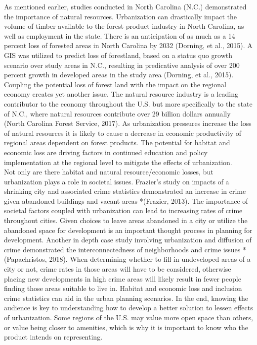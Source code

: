\documentclass[20pt]{article}
\begin{document}
\vspace{5mm} As mentioned earlier, studies conducted in North Carolina (N.C.) demonstrated the importance of natural resources. Urbanization can drastically impact the volume of timber available to the forest product industry in North Carolina, as well as employment in the state. There is an anticipation of as much as a 14 percent loss of forested areas in North Carolina by 2032 (Dorning, et al., 2015). A GIS was utilized to predict loss of forestland, based on a status quo growth scenario over study areas in N.C., resulting in predicative analysis of over 200 percent growth in developed areas in the study area (Dorning, et al., 2015). Coupling the potential loss of forest land with the impact on the regional economy creates yet another issue. The natural resource industry is a leading contributor to the economy throughout the U.S. but more specifically to the state of N.C., where natural resources contribute over 29 billion dollars annually (North Carolina Forest Service, 2017). As urbanization pressures increase the loss of natural resources it is likely to cause a decrease in economic productivity of regional areas dependent on forest products. The potential for habitat and economic loss are driving factors in continued education and policy implementation at the regional level to mitigate the effects of urbanization.\\   
\vspace{5mm} Not only are there habitat and natural resource/economic losses, but urbanization plays a role in societal issues. Frazier’s study on impacts of a shrinking city and associated crime statistics demonstrated an increase in crime given abandoned buildings and vacant areas *(Frazier, 2013). The importance of societal factors coupled with urbanization can lead to increasing rates of crime throughout cities. Given choices to leave areas abandoned in a city or utilize the abandoned space for development is an important thought process in planning for development. Another in depth case study involving urbanization and diffusion of crime demonstrated the interconnectedness of neighborhoods and crime issues *(Papachristos, 2018). When determining whether to fill in undeveloped areas of a city or not, crime rates in those areas will have to be considered, otherwise placing new developments in high crime areas will likely result in fewer people finding those areas suitable to live in. Habitat and economic loss and inclusion crime statistics can aid in the urban planning scenarios. In the end, knowing the audience is key to understanding how to develop a better solution to lessen effects of urbanization. Some regions of the U.S. may value more open space than others, or value being closer to amenities, which is why it is important to know who the product intends on representing.
\end{document}
